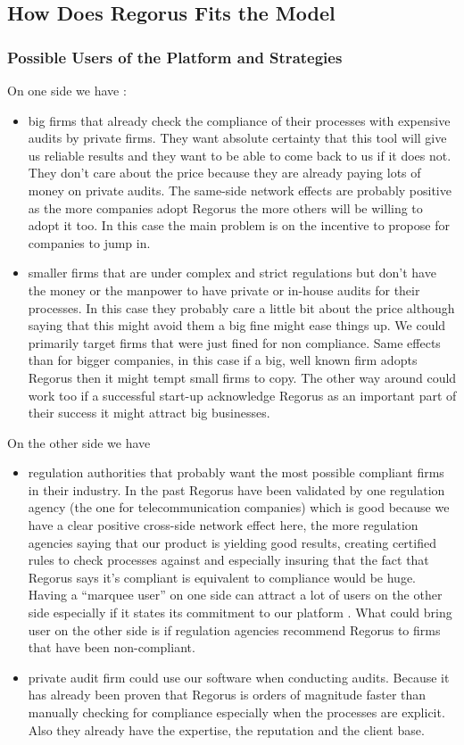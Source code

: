 \documentclass[10pt]{report}
\begin{document}
\subsection{How Does Regorus Fits the Model}

\subsubsection{Possible Users of the Platform and Strategies}
On one side we have :
\begin{itemize}
\item big firms that already check the compliance of their processes with expensive audits by private firms. They want absolute certainty that this tool will give us reliable results and they want to be able to come back to us if it does not. They don't care about the price because they are already paying lots of money on private audits. The same-side network effects are probably positive as the more companies adopt Regorus the more others will be willing to adopt it too. In this case the main problem is on the incentive to propose for companies to jump in.
\item smaller firms that are under complex and strict regulations but don't have the money or the manpower to have private or in-house audits for their processes. In this case they probably care a little bit about the price although saying that this might avoid them a big fine might ease things up. We could primarily target firms that were just fined for non compliance. Same effects than for bigger companies, in this case if a big, well known firm adopts Regorus then it might tempt small firms to copy. The other way around could work too if a successful start-up acknowledge Regorus as an important part of their success it might attract big businesses.
\end{itemize}

On the other side we have
\begin{itemize}
\item regulation authorities that probably want the most possible compliant firms in their industry. In the past Regorus have been validated by one regulation agency (the one for telecommunication companies) which is good because we have a clear positive cross-side network effect here, the more regulation agencies saying that our product is yielding good results, creating certified rules to check processes against and especially insuring that the fact that Regorus says it's compliant is equivalent to compliance would be huge. Having a \enquote{marquee user} on one side can attract a lot of users on the other side especially if it states its commitment to our platform \autocite{eisenmann2006strategies}. What could bring user on the other side is if regulation agencies recommend Regorus to firms that have been non-compliant. 
\item private audit firm could use our software when conducting audits. Because it has already been proven that Regorus is orders of magnitude faster than manually checking for compliance especially when the processes are explicit. Also they already have the expertise, the reputation and the client base.
\end{itemize}
\end{document}
